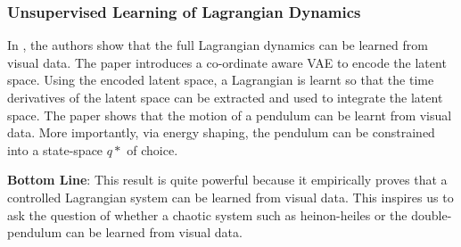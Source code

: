 \documentclass{article}
\begin{document}
%
% 
%


\subsubsection{Unsupervised Learning of Lagrangian Dynamics}

In \cite{zhong_unsupervised_2020}, the authors show that the full Lagrangian dynamics can be learned from visual data. The paper introduces a co-ordinate aware VAE to encode the latent space. Using the encoded latent space, a Lagrangian is learnt so that the time derivatives of the latent space can be extracted and used to integrate the latent space. The paper shows that the motion of a pendulum can be learnt from visual data. More importantly, via energy shaping, the pendulum can be constrained into a state-space $q*$ of choice.

\textbf{Bottom Line}: This result is quite powerful because it empirically proves that a controlled Lagrangian system can be learned from visual data. This inspires us to ask the question of whether a chaotic system such as heinon-heiles or the double-pendulum can be learned from visual data.
\end{document}
